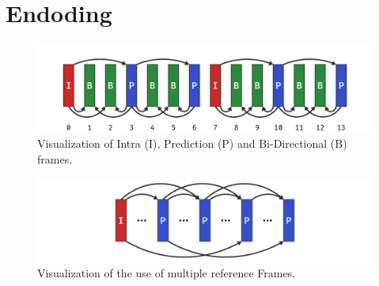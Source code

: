 \section{Endoding}
\cite{ridgerunNVIDIAH265Encoding2021}

\begin{figure}[H]
    \centering
    \includegraphics[width=\textwidth]{figures/encoding/ipb_frames.pdf}
    \caption{Visualization of Intra (I), Prediction (P) and Bi-Directional (B) frames.}
    \label{fig:ipb_frames}
\end{figure}

\begin{figure}[H]
    \centering
    \includegraphics[width=\textwidth]{figures/encoding/multiple_references.pdf}
    \caption{Visualization of the use of multiple reference Frames.}
    \label{fig:multiple_reference_frames}
\end{figure}
